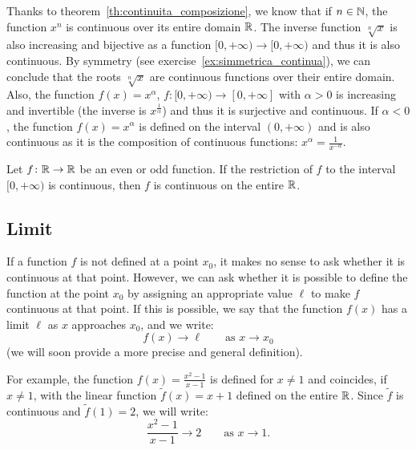 Thanks to theorem~\ref{th:continuita_composizione}, we know 
that if $n\in {\mathbb N}$, the function $x^n$ is continuous over its 
entire domain ${\mathbb R}$. 
The inverse function $\sqrt[n]{x}$ is also increasing and 
bijective as a function $[0,+\infty)\to[0,+\infty)$ and thus 
it is also continuous.
By symmetry (see exercise~\ref{ex:simmetrica_continua}), 
we can conclude 
that the roots $\sqrt[n]{x}$ are 
continuous functions over their entire domain.
Also, the function $f(x) = x^\alpha$, $f\colon [0,+\infty)\to [0,+\infty]$ 
with $\alpha>0$ is increasing and invertible (the inverse is $x^{\frac 1
\alpha}$)
and thus it is surjective and continuous.
If $\alpha<0$, the function $f(x)=x^\alpha$ is defined on the interval 
$(0,+\infty)$ and is also continuous as it is the composition of continuous
functions: $x^{\alpha} = \frac{1}{x^{-\alpha}}$.

%
\begin{exercise}\label{ex:simmetrica_continua}
  Let $f\colon {\mathbb R}\to {\mathbb R}$ be an even or odd function.
  If the restriction of $f$ to the interval $[0,+\infty)$ 
  is continuous, then $f$ is continuous on the entire ${\mathbb R}$.
\end{exercise}

\subsection{Limit}

If a function $f$ is not defined at a point $x_0$, it makes no sense to ask
whether it is continuous at that point. 
However, we can ask whether it is possible to define the function at the point 
$x_0$ by assigning an appropriate value $\ell$ to make $f$ continuous 
at that point. 
If this is possible, we say that the function $f(x)$ has a limit $\ell$ 
as $x$ approaches $x_0$, and we write:
\[
  f(x) \to \ell \qquad \text{as $x\to x_0$}
\]
(we will soon provide a more precise and general definition).

For example, the function $f(x) = \frac{x^2-1}{x-1}$ is defined for $x\neq 1$
and coincides, if $x\neq 1$, with the linear function $\tilde f(x) = x+1$
defined
on the entire ${\mathbb R}$. 
Since $\tilde f$ is continuous and $\tilde f(1)=2$,
we will write:
\[
  \frac{x^2-1}{x-1} \to 2
  \qquad \text{as $x\to 1$.}
\]

